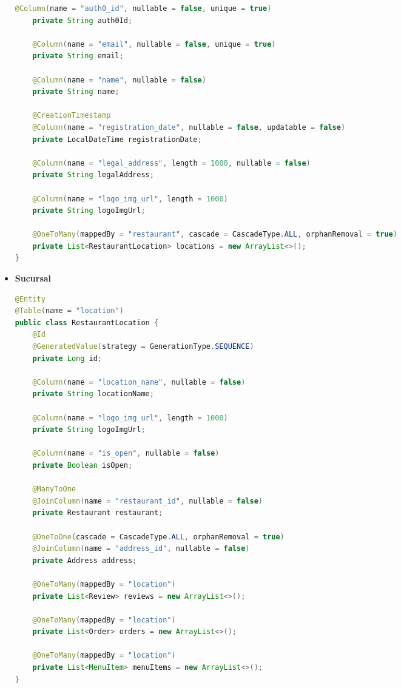 \begin{itemize}
\begin{lstlisting}[style=common, language=Java]
    @Column(name = "auth0_id", nullable = false, unique = true)
    private String auth0Id;

    @Column(name = "email", nullable = false, unique = true)
    private String email;

    @Column(name = "name", nullable = false)
    private String name;

    @CreationTimestamp
    @Column(name = "registration_date", nullable = false, updatable = false)
    private LocalDateTime registrationDate;

    @Column(name = "legal_address", length = 1000, nullable = false)
    private String legalAddress;

    @Column(name = "logo_img_url", length = 1000)
    private String logoImgUrl;

    @OneToMany(mappedBy = "restaurant", cascade = CascadeType.ALL, orphanRemoval = true)
    private List<RestaurantLocation> locations = new ArrayList<>();
}
\end{lstlisting}


\item \textbf{Sucursal}

\begin{lstlisting}[style=common, language=Java]
@Entity
@Table(name = "location")
public class RestaurantLocation {
    @Id
    @GeneratedValue(strategy = GenerationType.SEQUENCE)
    private Long id;

    @Column(name = "location_name", nullable = false)
    private String locationName;
    
    @Column(name = "logo_img_url", length = 1000)
    private String logoImgUrl;
    
    @Column(name = "is_open", nullable = false)
    private Boolean isOpen;

    @ManyToOne
    @JoinColumn(name = "restaurant_id", nullable = false)
    private Restaurant restaurant;

    @OneToOne(cascade = CascadeType.ALL, orphanRemoval = true)
    @JoinColumn(name = "address_id", nullable = false)
    private Address address;
    
    @OneToMany(mappedBy = "location")
    private List<Review> reviews = new ArrayList<>();
    
    @OneToMany(mappedBy = "location")
    private List<Order> orders = new ArrayList<>();

    @OneToMany(mappedBy = "location")
    private List<MenuItem> menuItems = new ArrayList<>();
}
\end{lstlisting}



\end{itemize}
